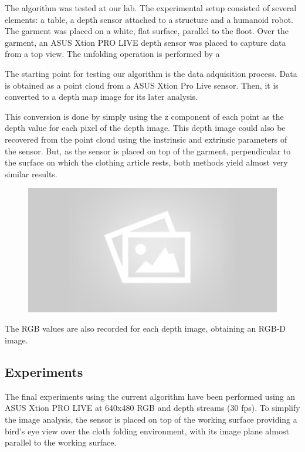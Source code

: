 The algorithm was tested at our lab. The experimental setup consisted of several elements: a table, a depth sensor attached to a structure and a humanoid robot. The garment was placed on a white, flat surface, parallel to the floot. Over the garment, an ASUS Xtion PRO LIVE depth sensor was placed to capture data from a top view. The unfolding operation is performed by a 

\comment{[...]}

The starting point for testing our algorithm is the data adquisition process. Data is obtained as a point cloud from a ASUS Xtion Pro Live sensor. Then, it is converted to a depth map image for its later analysis. 

This conversion is done by simply using the z component of each point as the depth value for each pixel of the depth image. This depth image could also be recovered from the point cloud using the instrinsic and extrinsic parameters of the sensor. But, as the sensor is placed on top of the garment, perpendicular to the surface on which the clothing article rests, both methods yield almost very similar results.

\begin{figure}[thpb]
    \centering
    \includegraphics[width=0.7
    \textwidth]{figures/placeholder2.png}
    \caption{}
    \label{fig:point_cloud_and_depth_image}
\end{figure}

The RGB values are also recorded for each depth image, obtaining an RGB-D image.

\subsection{Experiments }
\label{experiments:experiments}

The final experiments using the current algorithm have been performed using an ASUS Xtion PRO LIVE at 640x480 RGB and depth streams (30 fps).
To simplify the image analysis, the sensor is placed on top of the working surface  providing a bird's eye view over the cloth folding environment, with its image plane almost parallel to the working surface.

